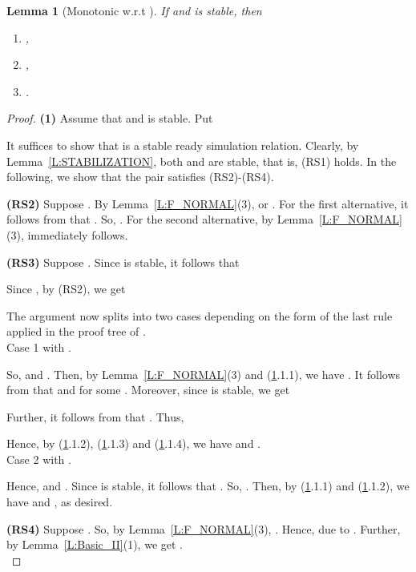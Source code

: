 \documentclass{elsarticle}
\theoremstyle{plain}
\newtheorem{lemma}[theorem]{Lemma}
\theoremstyle{definition}
\begin{document}
\begin{lemma}[Monotonic w.r.t ]\label{L:CONGRUENCE_STABLE}
If  and  is stable, then
\begin{enumerate}
  \item ,
  \item ,
  \item .
\end{enumerate}
\end{lemma}
\begin{proof}
\textbf{(1)} Assume that  and  is stable. Put

It suffices to show that  is a stable ready simulation relation.
Clearly, by Lemma~\ref{L:STABILIZATION}, both  and  are stable, that is, (RS1) holds. In the following, we show that the pair  satisfies (RS2)-(RS4).

\textbf{(RS2)} Suppose  .
    By Lemma~\ref{L:F_NORMAL}(3),  or .
    For the first alternative, it follows from  that . So, .
    For the second alternative, by Lemma~\ref{L:F_NORMAL}(3),  immediately follows.

\textbf{(RS3)} Suppose .
    Since  is stable, it follows that
    
    Since , by (RS2), we get
    
     The argument now splits into two cases depending on  the form of the last rule applied in the proof tree of .\\

\noindent  Case 1  with .

        So,  and .
        Then, by Lemma~\ref{L:F_NORMAL}(3) and (\ref{L:CONGRUENCE_STABLE}.1.1), we have .
        It follows from  that  and  for some .
        Moreover, since  is stable, we get
        
        Further, it follows from  that .
        Thus,
        
        Hence, by (\ref{L:CONGRUENCE_STABLE}.1.2), (\ref{L:CONGRUENCE_STABLE}.1.3) and (\ref{L:CONGRUENCE_STABLE}.1.4), we have   and .\\

\noindent  Case 2  with .

    Hence,  and .
   Since  is stable, it follows that .
   So, .
   Then, by (\ref{L:CONGRUENCE_STABLE}.1.1) and  (\ref{L:CONGRUENCE_STABLE}.1.2), we have  and ,  as desired.

\textbf{(RS4)} Suppose .
 So, by Lemma~\ref{L:F_NORMAL}(3), .
 Hence,  due to .
Further, by Lemma~\ref{L:Basic_II}(1), we get .\\


\end{proof}
\end{document}
